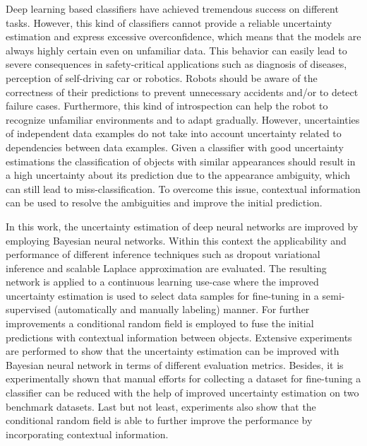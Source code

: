 Deep learning based classifiers have achieved tremendous success on different tasks. 
However, this kind of classifiers cannot provide a reliable uncertainty estimation and express excessive overconfidence, which means that the models are always highly certain even on unfamiliar data.
This behavior can easily lead to severe consequences in safety-critical applications such as diagnosis of diseases, perception of self-driving car or robotics. 
Robots should be aware of the correctness of their predictions to prevent unnecessary accidents and/or to detect failure cases.
Furthermore, this kind of introspection can help the robot to recognize unfamiliar environments and to adapt gradually.
However, uncertainties of independent data examples do not take into account uncertainty related to dependencies between data examples.
Given a classifier with good uncertainty estimations the classification of objects with similar appearances should result in a high uncertainty about its prediction due to the appearance ambiguity, which can still lead to miss-classification. To overcome this issue, contextual information can be used to resolve the ambiguities and improve the initial prediction.

In this work, the uncertainty estimation of deep neural networks are improved by employing Bayesian neural networks. 
Within this context the applicability and performance of different inference techniques such as dropout variational inference and scalable Laplace approximation are evaluated.
The resulting network is applied to a continuous learning use-case where the improved uncertainty estimation is used to select data samples for fine-tuning in a semi-supervised (automatically and manually labeling) manner.
For further improvements a conditional random field is employed to fuse the initial predictions with contextual information between objects.
Extensive experiments are performed to show that the uncertainty estimation can be improved with Bayesian neural network in terms of different evaluation metrics.
Besides, it is experimentally shown that manual efforts for collecting a dataset for fine-tuning a classifier can be reduced with the help of improved uncertainty estimation on two benchmark datasets. 
Last but not least, experiments also show that the conditional random field is able to further improve the performance by incorporating contextual information.

\switchlanguage{\lang} %
